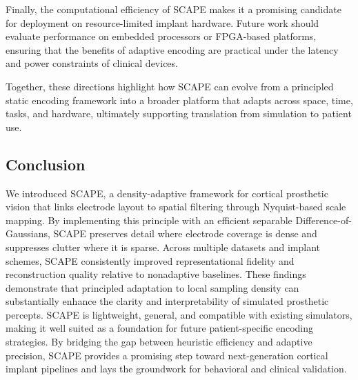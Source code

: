 Finally, the computational efficiency of SCAPE makes it a promising candidate for deployment on resource-limited implant hardware. Future work should evaluate performance on embedded processors or FPGA-based platforms, ensuring that the benefits of adaptive encoding are practical under the latency and power constraints of clinical devices.

Together, these directions highlight how SCAPE can evolve from a principled static encoding framework into a broader platform that adapts across space, time, tasks, and hardware, ultimately supporting translation from simulation to patient use.

\subsection{Conclusion}
We introduced SCAPE, a density-adaptive framework for cortical prosthetic vision that links electrode layout to spatial filtering through Nyquist-based scale mapping. By implementing this principle with an efficient separable Difference-of-Gaussians, SCAPE preserves detail where electrode coverage is dense and suppresses clutter where it is sparse. Across multiple datasets and implant schemes, SCAPE consistently improved representational fidelity and reconstruction quality relative to nonadaptive baselines. These findings demonstrate that principled adaptation to local sampling density can substantially enhance the clarity and interpretability of simulated prosthetic percepts. SCAPE is lightweight, general, and compatible with existing simulators, making it well suited as a foundation for future patient-specific encoding strategies. By bridging the gap between heuristic efficiency and adaptive precision, SCAPE provides a promising step toward next-generation cortical implant pipelines and lays the groundwork for behavioral and clinical validation.
